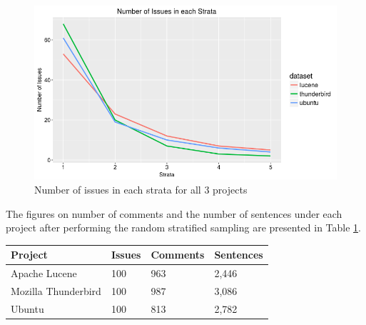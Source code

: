 \documentclass[a4paper,12pt,twoside]{report}
\begin{document}
\begin{figure}[H] %
    \centering
    \includegraphics[width=12cm]{rss-multi-line-plot}
    \caption{Number of issues in each strata for all 3 projects}
    \label{fig:multilineStrata}
\end{figure}
\noindent
The figures on number of comments and the number of sentences under each project after performing the random stratified sampling are presented in Table \ref{tab:overviewRSS}. 
\begin{table}[H] %
    \centering
    \begin{adjustbox}{max width=\columnwidth}
    \def\arraystretch{1} %
    \begin{tabular}{p{4cm} p{1cm} p{2cm} p{3cm}}
        \toprule
        \textbf{Project} & \textbf{Issues} & \textbf{Comments} & \textbf{Sentences}\\
        \midrule
			Apache Lucene & 100 & 963 & 2,446\\
			Mozilla Thunderbird & 100 & 987 & 3,086\\ 
			Ubuntu & 100 & 813 & 2,782\\
        \midrule
    \end{tabular}
    \end{adjustbox}
    \label{tab:overviewRSS}
\end{table}
\end{document}
